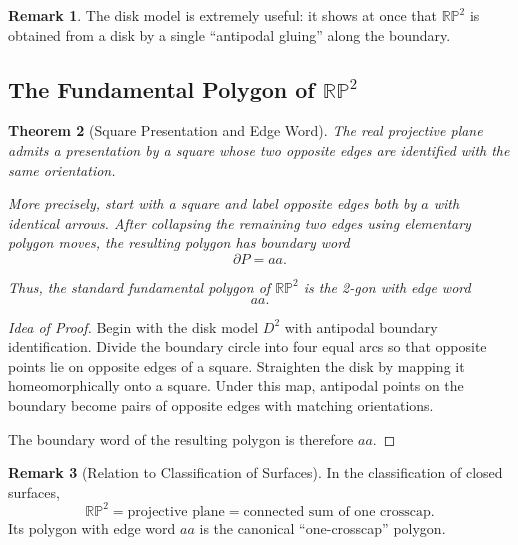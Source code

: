 \documentclass[12pt,a4paper]{article}
\theoremstyle{plain}
\newtheorem{theorem}{Theorem}[section]
\theoremstyle{definition}      %
\newtheorem{remark}[theorem]{Remark}
\begin{document}
\begin{remark}
	The disk model is extremely useful: it shows at once that $\mathbb{RP}^2$ is
	obtained from a disk by a single ``antipodal gluing'' along the boundary.
\end{remark}

\subsection{The Fundamental Polygon of $\mathbb{RP}^2$}

\begin{theorem}[Square Presentation and Edge Word]
	The real projective plane admits a presentation by a square whose two opposite
	edges are identified with the \emph{same} orientation.
	
	More precisely, start with a square and label opposite edges both by $a$
	with identical arrows.  
	After collapsing the remaining two edges using elementary polygon moves,
	the resulting polygon has boundary word
	\[
	\partial P = aa.
	\]
	
	Thus, the standard fundamental polygon of $\mathbb{RP}^2$ is the 2-gon with
	edge word
	\[
	aa.
	\]
\end{theorem}

\begin{proof}[Idea of Proof]
	Begin with the disk model $D^2$ with antipodal boundary identification.
	Divide the boundary circle into four equal arcs so that opposite points lie on
	opposite edges of a square.  
	Straighten the disk by mapping it homeomorphically onto a square.  
	Under this map, antipodal points on the boundary become pairs of opposite edges
	with matching orientations.
	
	The boundary word of the resulting polygon is therefore $aa$.
\end{proof}

\begin{remark}[Relation to Classification of Surfaces]
	In the classification of closed surfaces,
	\[
	\mathbb{RP}^2 = \text{projective plane} = \text{connected sum of one crosscap}.
	\]
	Its polygon with edge word $aa$ is the canonical ``one-crosscap'' polygon.
\end{remark}
\end{document}
